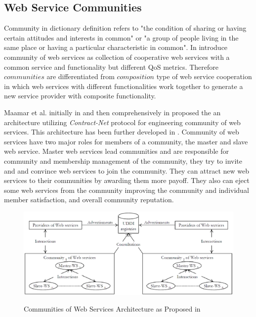         \subsection{Web Service Communities}\label{sec:CWSDefinition}
        Community in dictionary definition refers to "the condition of sharing or having certain attitudes and interests in common" or "a group of people living in the same place or having a particular characteristic in common". In \cite{DBLP:journals/internet/BenatallahSD03, Zeng:2003:QDW:775152.775211} introduce community of web services as collection of cooperative web services with a common service and functionality but different QoS metrics. Therefore $communities$ are differentiated from $composition$ type of web service cooperation in which web services with different functionalities work together to generate a new service provider with composite functionality.


        Maamar et al. initially in \cite{conf/webist/MaamarLBTS07} and then comprehensively in \cite{DBLP:journals/ijebr/MaamarSTBB09} proposed the an architecture
        utilizing \emph{Contract-Net} protocol for engineering community of web services.
        This architecture has been further developed in \cite{conf/IEEEscc/BenharrefSBB11, conf/IEEEscc/KhosravifarBMMT10, conf/aina/LimTM11, CSTintercommunity}.
        Community of web services have two major roles for members of a community, the master and slave web service.
        Master web services lead communities and are responsible for community and membership management of the community, they try to invite and and convince web services to join the
        community. They can attract new web services to their communities by awarding them more payoff. They also can eject some web services from the community improving the
        community and individual member satisfaction, and overall community reputation.

        \begin{figure}
            \begin{center}
            \includegraphics[width=16cm]{Figures/wsarch.eps}\label{wsarch}
            \caption{Communities of Web Services Architecture as Proposed in \cite{DBLP:journals/ijebr/MaamarSTBB09}}
            \end{center}
        \end{figure}


